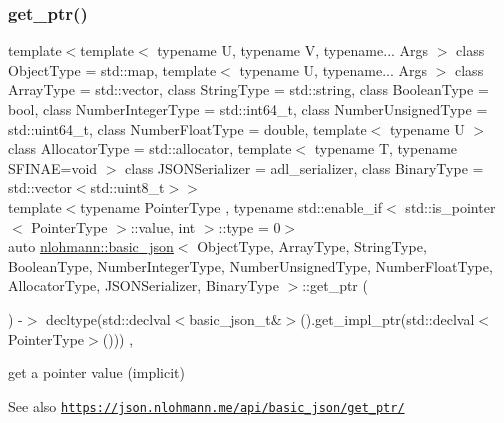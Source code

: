 \subsubsection{\texorpdfstring{get\+\_\+ptr()}{get\_ptr()}\hspace{0.1cm}{\footnotesize\ttfamily [1/2]}}
{\footnotesize\ttfamily template$<$template$<$ typename U, typename V, typename... Args $>$ class Object\+Type = std\+::map, template$<$ typename U, typename... Args $>$ class Array\+Type = std\+::vector, class String\+Type  = std\+::string, class Boolean\+Type  = bool, class Number\+Integer\+Type  = std\+::int64\+\_\+t, class Number\+Unsigned\+Type  = std\+::uint64\+\_\+t, class Number\+Float\+Type  = double, template$<$ typename U $>$ class Allocator\+Type = std\+::allocator, template$<$ typename T, typename S\+F\+I\+N\+A\+E=void $>$ class J\+S\+O\+N\+Serializer = adl\+\_\+serializer, class Binary\+Type  = std\+::vector$<$std\+::uint8\+\_\+t$>$$>$ \\
template$<$typename Pointer\+Type , typename std\+::enable\+\_\+if$<$ std\+::is\+\_\+pointer$<$ Pointer\+Type $>$\+::value, int $>$\+::type  = 0$>$ \\
auto \hyperlink{classnlohmann_1_1basic__json}{nlohmann\+::basic\+\_\+json}$<$ Object\+Type, Array\+Type, String\+Type, Boolean\+Type, Number\+Integer\+Type, Number\+Unsigned\+Type, Number\+Float\+Type, Allocator\+Type, J\+S\+O\+N\+Serializer, Binary\+Type $>$\+::get\+\_\+ptr (\begin{DoxyParamCaption}{ }\end{DoxyParamCaption}) -\/$>$ decltype(std\+::declval$<$basic\+\_\+json\+\_\+t\&$>$().get\+\_\+impl\+\_\+ptr(std\+::declval$<$Pointer\+Type$>$()))
    \hspace{0.3cm}{\ttfamily [inline]}, {\ttfamily [noexcept]}}



get a pointer value (implicit) 

\begin{DoxySeeAlso}{See also}
\href{https://json.nlohmann.me/api/basic_json/get_ptr/}{\tt https\+://json.\+nlohmann.\+me/api/basic\+\_\+json/get\+\_\+ptr/} 
\end{DoxySeeAlso}
\mbox{\label{classnlohmann_1_1basic__json_ae4e9a0afab117f1642b90b9607285348}} 
